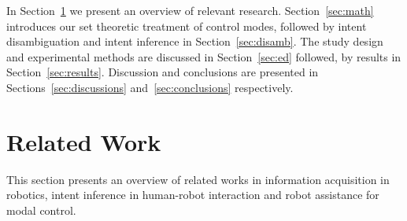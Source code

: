 \documentclass[conference]{IEEEtran}
\begin{document}

In Section~\ref{sec:related_work} we present an overview of relevant research. Section~\ref{sec:math} introduces our set theoretic treatment of control modes, followed by intent disambiguation and intent inference in Section~\ref{sec:disamb}. The study design and experimental methods are discussed in Section~\ref{sec:ed} followed, by results in Section~\ref{sec:results}. Discussion and conclusions are presented in Sections~\ref{sec:discussions} and~\ref{sec:conclusions} respectively. 


\section{Related Work}\label{sec:related_work}
This section presents an overview of related works in information acquisition in robotics, intent inference in human-robot interaction and robot assistance for modal control. 
%
\end{document}
